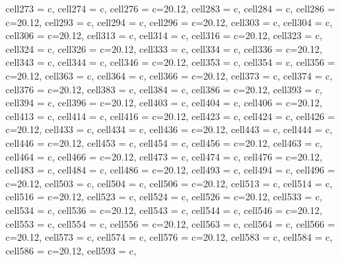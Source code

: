 \documentclass{article}
\begin{document}
{\begin{longtblr}
{  cell{27}{3} = {c},
  cell{27}{4} = {c},
  cell{27}{6} = {c=2}{0.12\linewidth},
  cell{28}{3} = {c},
  cell{28}{4} = {c},
  cell{28}{6} = {c=2}{0.12\linewidth},
  cell{29}{3} = {c},
  cell{29}{4} = {c},
  cell{29}{6} = {c=2}{0.12\linewidth},
  cell{30}{3} = {c},
  cell{30}{4} = {c},
  cell{30}{6} = {c=2}{0.12\linewidth},
  cell{31}{3} = {c},
  cell{31}{4} = {c},
  cell{31}{6} = {c=2}{0.12\linewidth},
  cell{32}{3} = {c},
  cell{32}{4} = {c},
  cell{32}{6} = {c=2}{0.12\linewidth},
  cell{33}{3} = {c},
  cell{33}{4} = {c},
  cell{33}{6} = {c=2}{0.12\linewidth},
  cell{34}{3} = {c},
  cell{34}{4} = {c},
  cell{34}{6} = {c=2}{0.12\linewidth},
  cell{35}{3} = {c},
  cell{35}{4} = {c},
  cell{35}{6} = {c=2}{0.12\linewidth},
  cell{36}{3} = {c},
  cell{36}{4} = {c},
  cell{36}{6} = {c=2}{0.12\linewidth},
  cell{37}{3} = {c},
  cell{37}{4} = {c},
  cell{37}{6} = {c=2}{0.12\linewidth},
  cell{38}{3} = {c},
  cell{38}{4} = {c},
  cell{38}{6} = {c=2}{0.12\linewidth},
  cell{39}{3} = {c},
  cell{39}{4} = {c},
  cell{39}{6} = {c=2}{0.12\linewidth},
  cell{40}{3} = {c},
  cell{40}{4} = {c},
  cell{40}{6} = {c=2}{0.12\linewidth},
  cell{41}{3} = {c},
  cell{41}{4} = {c},
  cell{41}{6} = {c=2}{0.12\linewidth},
  cell{42}{3} = {c},
  cell{42}{4} = {c},
  cell{42}{6} = {c=2}{0.12\linewidth},
  cell{43}{3} = {c},
  cell{43}{4} = {c},
  cell{43}{6} = {c=2}{0.12\linewidth},
  cell{44}{3} = {c},
  cell{44}{4} = {c},
  cell{44}{6} = {c=2}{0.12\linewidth},
  cell{45}{3} = {c},
  cell{45}{4} = {c},
  cell{45}{6} = {c=2}{0.12\linewidth},
  cell{46}{3} = {c},
  cell{46}{4} = {c},
  cell{46}{6} = {c=2}{0.12\linewidth},
  cell{47}{3} = {c},
  cell{47}{4} = {c},
  cell{47}{6} = {c=2}{0.12\linewidth},
  cell{48}{3} = {c},
  cell{48}{4} = {c},
  cell{48}{6} = {c=2}{0.12\linewidth},
  cell{49}{3} = {c},
  cell{49}{4} = {c},
  cell{49}{6} = {c=2}{0.12\linewidth},
  cell{50}{3} = {c},
  cell{50}{4} = {c},
  cell{50}{6} = {c=2}{0.12\linewidth},
  cell{51}{3} = {c},
  cell{51}{4} = {c},
  cell{51}{6} = {c=2}{0.12\linewidth},
  cell{52}{3} = {c},
  cell{52}{4} = {c},
  cell{52}{6} = {c=2}{0.12\linewidth},
  cell{53}{3} = {c},
  cell{53}{4} = {c},
  cell{53}{6} = {c=2}{0.12\linewidth},
  cell{54}{3} = {c},
  cell{54}{4} = {c},
  cell{54}{6} = {c=2}{0.12\linewidth},
  cell{55}{3} = {c},
  cell{55}{4} = {c},
  cell{55}{6} = {c=2}{0.12\linewidth},
  cell{56}{3} = {c},
  cell{56}{4} = {c},
  cell{56}{6} = {c=2}{0.12\linewidth},
  cell{57}{3} = {c},
  cell{57}{4} = {c},
  cell{57}{6} = {c=2}{0.12\linewidth},
  cell{58}{3} = {c},
  cell{58}{4} = {c},
  cell{58}{6} = {c=2}{0.12\linewidth},
  cell{59}{3} = {c},
}
\end{longtblr}}
\end{document}
